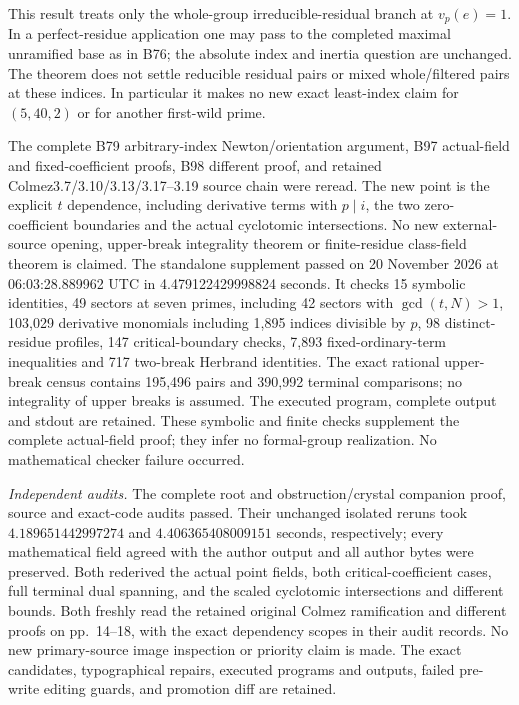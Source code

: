 \begin{remark}
\label{rem:B-RD99-scope}
This result treats only the whole-group irreducible-residual
branch at $v_p(e)=1$. In a perfect-residue application one may
pass to the completed maximal unramified base as in B76; the
absolute index and inertia question are unchanged. The theorem
does not settle reducible residual pairs or mixed whole/filtered
pairs at these indices. In particular it makes no new exact
least-index claim for $(5,40,2)$ or for another first-wild prime.

The complete B79 arbitrary-index Newton/orientation argument,
B97 actual-field and fixed-coefficient proofs, B98 different
proof, and retained Colmez3.7/3.10/3.13/3.17--3.19 source chain
were reread. The new point is the explicit $t$ dependence,
including derivative terms with $p\mid i$, the two zero-coefficient
boundaries and the actual cyclotomic intersections. No new
external-source opening, upper-break integrality theorem or
finite-residue class-field theorem is claimed. The standalone
supplement
passed on 20 November 2026 at 06:03:28.889962 UTC in
4.479122429998824 seconds. It checks 15 symbolic identities,
49 sectors at seven primes, including 42 sectors with
$\gcd(t,N)>1$, 103,029 derivative monomials including 1,895
indices divisible by $p$, 98 distinct-residue profiles,
147 critical-boundary checks, 7,893 fixed-ordinary-term
inequalities and 717 two-break Herbrand identities.
The exact rational upper-break census contains 195,496 pairs
and 390,992 terminal comparisons; no integrality of upper
breaks is assumed. The executed program, complete output and
stdout are retained. These symbolic and finite checks supplement
the complete actual-field proof; they infer no formal-group
realization. No mathematical checker failure occurred.

\smallskip
\noindent\emph{Independent audits.}
The complete root and obstruction/crystal companion
proof, source and exact-code audits passed. Their
unchanged isolated reruns took \(4.189651442997274\) and \(4.406365408009151\)
seconds, respectively; every mathematical field agreed
with the author output and all author bytes were
preserved. Both rederived the actual point fields,
both critical-coefficient cases, full terminal dual
spanning, and the scaled cyclotomic intersections and
different bounds. Both freshly read the retained
original Colmez ramification and different proofs on
pp.~14--18, with the exact dependency scopes in their
audit records. No new primary-source image inspection
or priority claim is made. The exact candidates,
typographical repairs, executed programs and outputs,
failed pre-write editing guards, and promotion diff
are retained.
\end{remark}
